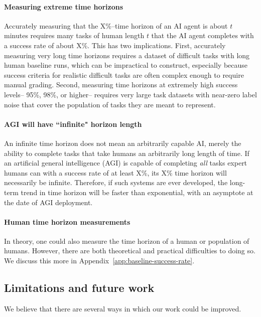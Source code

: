 \documentclass{article}
\begin{document}
\paragraph{Measuring extreme time horizons} \label{sec:measuring-extreme-time-horizons} Accurately measuring that the X\%--time horizon of an AI agent is about $t$ minutes requires many tasks of human length $t$ that the AI agent completes with a success rate of about X\%. This has two implications. First, accurately measuring very long time horizons requires a dataset of difficult tasks with long human baseline runs, which can be impractical to construct, especially because success criteria for realistic difficult tasks are often complex enough to require manual grading. Second, measuring time horizons at extremely high success levels-- 95\%, 98\%, or higher-- requires very large task datasets with near-zero label noise that cover the population of tasks they are meant to represent.

\paragraph{AGI will have ``infinite" horizon length} An infinite time horizon does not mean an arbitrarily capable AI, merely the ability to complete tasks that take humans an arbitrarily long length of time. If an artificial general intelligence (AGI) is capable of completing \textit{all} tasks expert humans can with a success rate of at least X\%, its X\% time horizon will necessarily be infinite. Therefore, if such systems are ever developed, the long-term trend in time horizon will be faster than exponential, with an asymptote at the date of AGI deployment.

\paragraph{Human time horizon measurements} In theory, one could also measure the time horizon of a human or population of humans. However, there are both theoretical and practical difficulties to doing so. We discuss this more in Appendix~\ref{app:baseline-success-rate}.

\subsection{Limitations and future work}
We believe that there are several ways in which our work could be improved.
\end{document}
